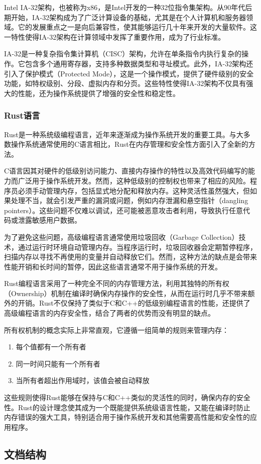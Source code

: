 Intel IA-32架构，也被称为x86，是Intel开发的一种32位指令集架构。从90年代后期开始，IA-32架构成为了广泛计算设备的基础，尤其是在个人计算机和服务器领域。它的发展重点之一是向后兼容性，使其能够运行几十年来开发的大量软件。这一特性使得IA-32架构在计算领域中发挥了重要作用，成为了行业标准。

IA-32是一种复杂指令集计算机（CISC）架构，允许在单条指令内执行复杂的操作。它包含多个通用寄存器，支持多种数据类型和寻址模式。此外，IA-32架构还引入了保护模式（Protected Mode），这是一个操作模式，提供了硬件级别的安全功能，如特权级别、分段、虚拟内存和分页。这些特性使得IA-32架构不仅具有强大的性能，还为操作系统提供了增强的安全性和稳定性。

\subsubsection{Rust语言}

Rust是一种系统级编程语言，近年来逐渐成为操作系统开发的重要工具。与大多数操作系统通常使用的C语言相比，Rust在内存管理和安全性方面引入了全新的方法。

C语言因其对硬件的低级别访问能力、直接内存操作的特性以及高效代码编写的能力而广泛用于操作系统开发。然而，这种低级别的控制权也带来了相应的风险。程序员必须手动管理内存，包括显式地分配和释放内存。这种灵活性虽然强大，但如果处理不当，就会引发严重的漏洞或问题，例如内存泄漏和悬空指针（dangling pointers）。这些问题不仅难以调试，还可能被恶意攻击者利用，导致执行任意代码或泄露敏感用户数据。

为了避免这些问题，高级编程语言通常使用垃圾回收（Garbage Collection）技术，通过运行时环境自动管理内存。当程序运行时，垃圾回收器会定期暂停程序，扫描内存以寻找不再使用的变量并自动释放它们。然而，这种方法的缺点是会带来性能开销和长时间的暂停，因此这些语言通常不用于操作系统的开发。

Rust编程语言采用了一种完全不同的内存管理方法，利用其独特的所有权（Ownership）机制在编译时确保内存操作的安全性，从而在运行时几乎不带来额外的开销。Rust不仅保持了类似于C和C++的低级别编程语言的性能，还提供了高级编程语言的内存安全性，结合了两者的优势而没有明显的缺点。

所有权机制的概念实际上非常直观，它遵循一组简单的规则来管理内存：

\begin{enumerate}
    \item 每个值都有一个所有者
    \item 同一时间只能有一个所有者
    \item 当所有者超出作用域时，该值会被自动释放
\end{enumerate}

这些规则使得Rust能够在保持与C和C++类似的灵活性的同时，确保内存的安全性。Rust的设计理念使其成为一个既能提供系统级语言性能，又能在编译时防止内存错误的强大工具，特别适合用于操作系统开发和其他需要高性能和安全性的应用程序。

\subsection{文档结构}